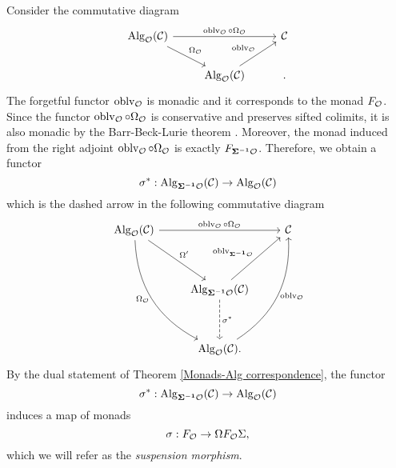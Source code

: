 \begin{construction}

Consider the commutative diagram
\[
\begin{tikzcd}
     \Alg_{\CO}(\CC) &   & \CC\\
                     & \Alg_{\CO}(\CC) &
    \arrow[from = 1-1, to = 1-3, "\oblv_{\CO}\circ \Omega_{\CO}"]
    \arrow[from = 1-1, to = 2-2, "\Omega_{\CO}" ]
    \arrow[from = 2-2, to = 1-3, "\oblv_{\CO}"].
\end{tikzcd}
\]
The forgetful functor $\operatorname{oblv}_{{\mathcal{O}}}$ is monadic and it corresponds to the monad $F_{{\mathcal{O}}}$. Since the functor $\operatorname{oblv}_{{\mathcal{O}}}\circ \Omega_{{\mathcal{O}}}$ is conservative and preserves sifted colimits, it is also monadic by the Barr-Beck-Lurie theorem \cite[Theorem 4.7.3.5.]{HA}. Moreover, the monad induced from the right adjoint $\operatorname{oblv}_{{\mathcal{O}}}\circ \Omega_{{\mathcal{O}}}$ is exactly $F_{\bf{\Sigma}^{-1} {\mathcal{O}}}$. 
Therefore, we obtain a functor 
$$
\sigma^{*}: \operatorname{Alg}_{\bf{\Sigma}^{-1} {\mathcal{O}} }({\mathcal{C}}) 
\to 
\operatorname{Alg}_{{\mathcal{O}}}({\mathcal{C}})
$$
which is the dashed arrow in the following commutative diagram
\[
\begin{tikzcd}
     \Alg_{\CO}(\CC) &   & \CC \\
                     &   &      \\
                     & \Alg_{\bf{\Sigma}^{-1} \CO }(\CC)  & \\
                     &   & \\
                     & \Alg_{ \CO }(\CC) 
    \arrow[from = 1-1, to = 1-3, "\oblv_{\CO}\circ \Omega_{\CO}"]
    \arrow[from = 1-1, to = 3-2, "\Omega'"]
    \arrow[from = 3-2, to = 1-3, "\oblv_{\bf{\Sigma}^{-1} \CO }"]
    \arrow[from = 1-1, to = 5-2, "\Omega_{\CO}" left , bend right]
    \arrow[from = 5-2, to = 1-3, "\oblv_{\CO}" right , bend right]
    \arrow[from = 3-2, to = 5-2, "\sigma^{*}", dashed]
    .
\end{tikzcd}
\]
By the dual statement of Theorem \ref{Monads-Alg correspondence}, the functor 
$$
\sigma^{*}:
 \operatorname{Alg}_{\bf{\Sigma}^{-1} {\mathcal{O}} }({\mathcal{C}})\to \operatorname{Alg}_{{\mathcal{O}}}({\mathcal{C}})
$$
induces a map of monads
\begin{equation}
\label{suspension morphism}
    \sigma: F_{{\mathcal{O}}}\to \Omega F_{{\mathcal{O}}}\Sigma, 
\end{equation}
which we will refer as the \emph{suspension morphism}.
\end{construction}






